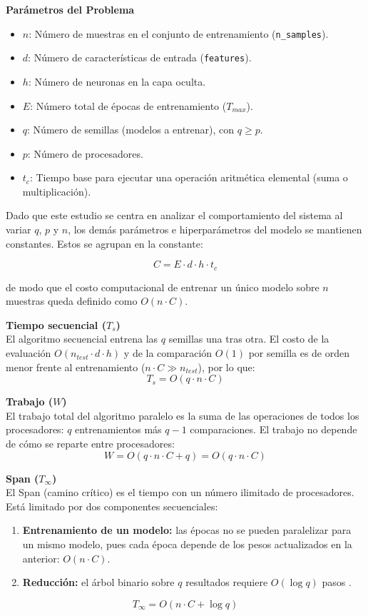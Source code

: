\documentclass[11pt, a4paper]{article}
\begin{document}
\textbf{Parámetros del Problema}
\begin{itemize}
    \item $n$: Número de muestras en el conjunto de entrenamiento (\texttt{n\_samples}).
    \item $d$: Número de características de entrada (\texttt{features}).
    \item $h$: Número de neuronas en la capa oculta.
    \item $E$: Número total de épocas de entrenamiento ($T_{max}$).
    \item $q$: Número de semillas (modelos a entrenar), con $q \geq p$.
    \item $p$: Número de procesadores.
    \item $t_c$: Tiempo base para ejecutar una operación aritmética elemental (suma o multiplicación).
\end{itemize}

Dado que este estudio se centra en analizar el comportamiento del sistema al variar $q$, $p$ y $n$, los demás parámetros e hiperparámetros del modelo se mantienen constantes. Estos se agrupan en la constante:

$$C = E \cdot d \cdot h \cdot t_c$$

\noindent de modo que el costo computacional de entrenar un único modelo sobre $n$ muestras queda definido como $O(n \cdot C)$.

\textbf{Tiempo secuencial ($T_s$)} \\
El algoritmo secuencial entrena las $q$ semillas una tras otra. El costo de la evaluación $O(n_{test} \cdot d \cdot h)$ y de la comparación $O(1)$ por semilla es de orden menor frente al entrenamiento ($n \cdot C \gg n_{test}$), por lo que:
$$T_s = O(q \cdot n \cdot C)$$

\textbf{Trabajo ($W$)} \\
El trabajo total del algoritmo paralelo es la suma de las operaciones de todos los procesadores: $q$ entrenamientos más $q - 1$ comparaciones. El trabajo no depende de cómo se reparte entre procesadores:
$$W = O(q \cdot n \cdot C + q) = O(q \cdot n \cdot C)$$

\textbf{Span ($T_\infty$)} \\
El Span (camino crítico) es el tiempo con un número ilimitado de procesadores. Está limitado por dos componentes secuenciales:
\begin{enumerate}
    \item \textbf{Entrenamiento de un modelo:} las épocas no se pueden paralelizar para un mismo modelo, pues cada época depende de los pesos actualizados en la anterior: $O(n \cdot C)$.
    \item \textbf{Reducción:} el árbol binario sobre $q$ resultados requiere $O(\log q)$ pasos \cite{jaja1992parallel}.
\end{enumerate}
$$T_\infty = O(n \cdot C + \log q)$$
\end{document}

